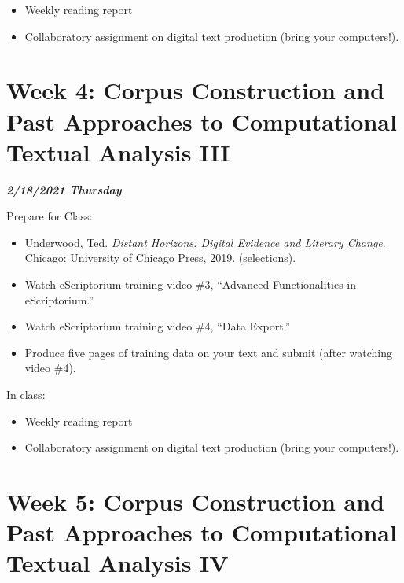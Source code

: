 \documentclass[
]{book}
\providecommand{\tightlist}{%
  \setlength{\itemsep}{0pt}\setlength{\parskip}{0pt}}
\begin{document}
\begin{itemize}
\tightlist
\item
  Weekly reading report
\item
  Collaboratory assignment on digital text production (bring your computers!).
\end{itemize}

\hypertarget{week-4-corpus-construction-and-past-approaches-to-computational-textual-analysis-iii-1}{%
\chapter{Week 4: Corpus Construction and Past Approaches to Computational Textual Analysis III}\label{week-4-corpus-construction-and-past-approaches-to-computational-textual-analysis-iii-1}}

\textbf{\emph{2/18/2021 Thursday}}

Prepare for Class:

\begin{itemize}
\tightlist
\item
  Underwood, Ted. \emph{Distant Horizons: Digital Evidence and Literary Change}. Chicago: University of Chicago Press, 2019. (selections).
\item
  Watch eScriptorium training video \#3, ``Advanced Functionalities in eScriptorium.''
\item
  Watch eScriptorium training video \#4, ``Data Export.''
\item
  Produce five pages of training data on your text and submit (after watching video \#4).
\end{itemize}

In class:

\begin{itemize}
\tightlist
\item
  Weekly reading report
\item
  Collaboratory assignment on digital text production (bring your computers!).
\end{itemize}

\hypertarget{week-5-corpus-construction-and-past-approaches-to-computational-textual-analysis-iv-1}{%
\chapter{Week 5: Corpus Construction and Past Approaches to Computational Textual Analysis IV}\label{week-5-corpus-construction-and-past-approaches-to-computational-textual-analysis-iv-1}}
\end{document}
